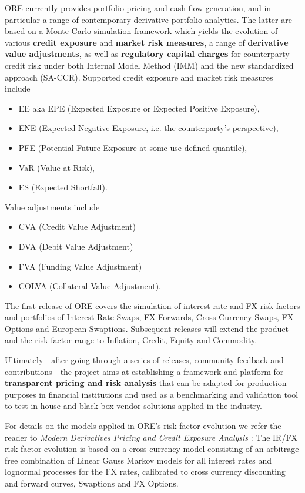 \documentclass[12pt, a4paper]{article}
\begin{document}
ORE currently provides portfolio pricing and cash flow generation, and in particular a range of contemporary derivative portfolio analytics. The latter are based on a Monte Carlo simulation framework which yields the evolution of various {\bf credit exposure} and {\bf market risk measures}, a range of {\bf derivative value adjustments}, as well as {\bf regulatory capital charges} for counterparty credit risk under both Internal Model Method (IMM) and the new standardized approach (SA-CCR). Supported credit exposure and market risk measures include
\begin{itemize}
\item EE aka EPE (Expected Exposure or Expected Positive Exposure), 
\item ENE (Expected Negative Exposure, i.e. the counterparty's perspective), 
\item PFE (Potential Future Exposure at some use defined quantile), 
\item VaR (Value at Risk),
\item ES (Expected Shortfall).
\end{itemize}
Value adjustments include 
\begin{itemize}
\item CVA (Credit Value Adjustment)
\item DVA (Debit Value Adjustment)
\item FVA (Funding Value Adjustment)
\item COLVA (Collateral Value Adjustment).
\end{itemize}

\medskip
The first release of ORE covers the simulation of interest rate and FX risk factors and portfolios of Interest Rate Swaps, FX Forwards, Cross Currency Swaps, FX Options and European Swaptions. Subsequent releases will extend the product and the risk factor range to Inflation, Credit, Equity and Commodity.     

\medskip
Ultimately - after going through a series of releases, community feedback and contributions - the project aims at establishing a framework and platform for {\bf transparent pricing and risk analysis} that can be adapted for production purposes in financial institutions and used as a benchmarking and validation tool to test in-house and black box vendor solutions applied in the industry. 

\medskip
For details on the models applied in ORE's risk factor evolution we refer the reader to {\em Modern Derivatives Pricing and Credit Exposure Analysis} \cite{Lichters}: The IR/FX risk factor evolution is based on a cross currency model consisting of an arbitrage free combination of Linear Gauss Markov models for all interest rates and lognormal processes for the FX rates, calibrated to cross currency discounting and forward curves, Swaptions and FX Options.%
 
\end{document}
